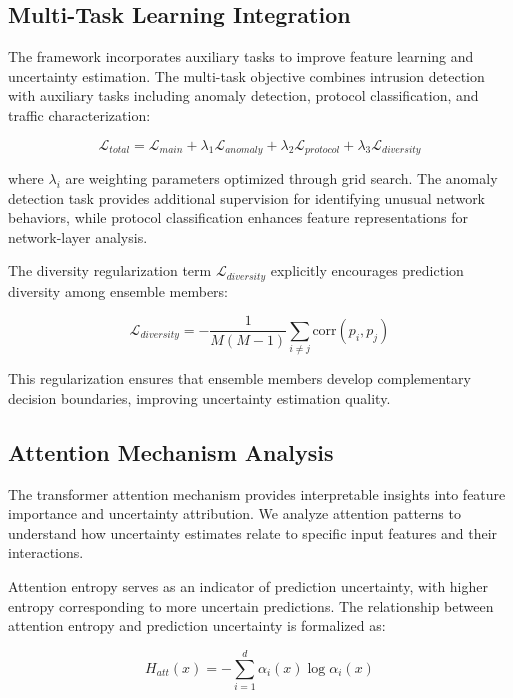 \documentclass[journal]{IEEEtran}
\begin{document}
\subsection{Multi-Task Learning Integration}

The framework incorporates auxiliary tasks to improve feature learning and uncertainty estimation. The multi-task objective combines intrusion detection with auxiliary tasks including anomaly detection, protocol classification, and traffic characterization:

\begin{equation}
\mathcal{L}_{total} = \mathcal{L}_{main} + \lambda_1 \mathcal{L}_{anomaly} + \lambda_2 \mathcal{L}_{protocol} + \lambda_3 \mathcal{L}_{diversity}
\end{equation}

where $\lambda_i$ are weighting parameters optimized through grid search. The anomaly detection task provides additional supervision for identifying unusual network behaviors, while protocol classification enhances feature representations for network-layer analysis.

The diversity regularization term $\mathcal{L}_{diversity}$ explicitly encourages prediction diversity among ensemble members:

\begin{equation}
\mathcal{L}_{diversity} = -\frac{1}{M(M-1)} \sum_{i \neq j} \text{corr}(p_i, p_j)
\end{equation}

This regularization ensures that ensemble members develop complementary decision boundaries, improving uncertainty estimation quality.

\subsection{Attention Mechanism Analysis}

The transformer attention mechanism provides interpretable insights into feature importance and uncertainty attribution. We analyze attention patterns to understand how uncertainty estimates relate to specific input features and their interactions.

Attention entropy serves as an indicator of prediction uncertainty, with higher entropy corresponding to more uncertain predictions. The relationship between attention entropy and prediction uncertainty is formalized as:

\begin{equation}
H_{att}(x) = -\sum_{i=1}^d \alpha_i(x) \log \alpha_i(x)
\end{equation}
\end{document}
